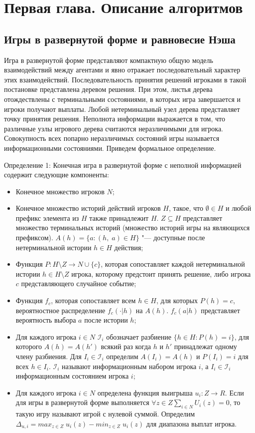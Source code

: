 \chapter{Первая глава. Описание алгоритмов}
\label{cha:ch_1}
\section{Игры в развернутой форме и равновесие Нэша}
\par
Игра в развернутой форме представляют компактную общую модель взаимодействий между агентами и явно отражает последовательный характер этих взаимодействий. Последовательность принятия решений игроками в такой постановке представлена деревом решения. При этом, листья дерева отождествлены с терминальными состояниями, в которых игра завершается и игроки получают выплаты. Любой нетерминальный узел дерева представляет точку принятия решения. Неполнота информации выражается в том, что различные узлы игрового дерева считаются неразличимыми для игрока. Совокупность всех попарно неразличимых состояний игры называется информационными состояниями. Приведем формальное определение.
\par
Определение 1: Конечная игра в развернутой форме с неполной информацией содержит следующие компоненты:
\begin{itemize}
	\item Конечное множество игроков $N$;
	\item Конечное множество историй действий игроков $H$, такое, что $\emptyset \in H$ и любой префикс элемента из $H$ также принадлежит $H$. $Z \subseteq H$ представляет множество терминальных историй (множество историй игры на являющихся префиксом). $A(h)=\{a \colon (h,\;a)\in H \}$ "--- доступные после нетерминальной истории $h\in H$ действия;
	\item Функция $P\colon H\setminus Z \to N \cup \{c\}$, которая сопоставляет каждой нетерминальной истории $h\in H\setminus Z$ игрока, которому предстоит принять решение, либо игрока $c$ представляющего случайное событие;
	\item Функция $f_c$, которая сопоставляет всем $h \in H$, для которых $P(h)=c$, вероятностное распределение $f_c(\cdot |h)$ на $A(h)$. $f_c(a|h)$ представляет вероятность выбора $a$ после истории $h$;
	\item Для каждого игрока $i \in N$ $\mathcal{I}_i $ обозначает разбиение $ \{h \in H \colon P(h) = i\}$, для которого $A(h)=A(h')$ всякий раз когда $h$ и $h'$ принадлежат одному члену разбиения. Для $I_i \in \mathcal{I}_i$ определим $A(I_i)=A(h)$ и $P(I_i)=i$ для всех $h \in I_i$. $\mathcal{I}_i$ называют информационным набором игрока $i$, а $I_i \in \mathcal{I}_i$ информационным состоянием игрока $i$;
	\item Для каждого игрока $i \in N$ определена функция выигрыша $u_i \colon Z \to R$. Если для игры в развернутой форме выполняется $\forall z \in Z \sum_{i \in N}U_i(z) = 0 $, то такую игру называют игрой с нулевой суммой. Определим $\Delta_{u,i} = max_{z\in Z}\;u_i(z) - min_{z\in Z}\;u_i(z)$ для диапазона выплат игрока. 
\end{itemize}
